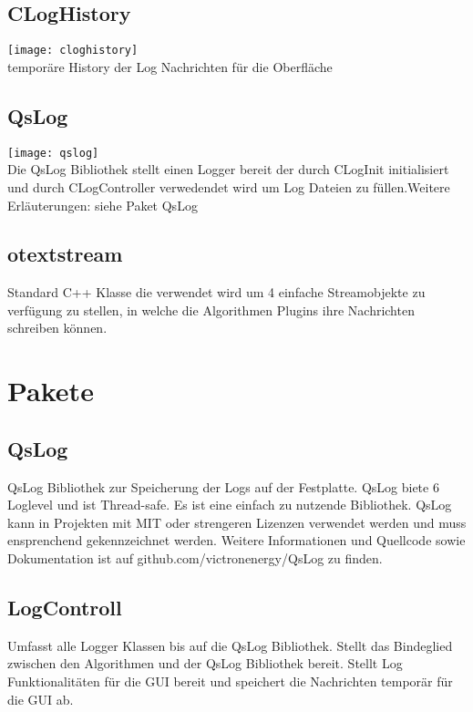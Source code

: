 \subsection{CLogHistory}\label{Logger: CLogHistory}
\texttt{[image: cloghistory]}\\
temporäre History der Log Nachrichten für die Oberfläche 
\beginMembers
{}
\closeMembers
\newpage
\subsection{QsLog}\label{Logger: QsLog}
\texttt{[image: qslog]}\\
Die QsLog Bibliothek stellt einen Logger bereit der durch CLogInit initialisiert und durch CLogController verwedendet wird um Log Dateien zu füllen.Weitere Erläuterungen: siehe Paket QsLog

\subsection{otextstream}\label{Logger: otextstream}
Standard C++ Klasse die verwendet wird um 4 einfache Streamobjekte zu verfügung zu stellen, in welche die Algorithmen Plugins ihre Nachrichten schreiben können.
\section{Pakete}
\subsection{QsLog}
QsLog Bibliothek zur Speicherung der Logs auf der Festplatte.
QsLog biete 6 Loglevel und ist Thread-safe. Es ist eine einfach zu nutzende Bibliothek.
QsLog kann in Projekten mit MIT oder strengeren Lizenzen verwendet werden und muss ensprenchend gekennzeichnet werden.
Weitere Informationen und Quellcode sowie Dokumentation ist auf github.com/victronenergy/QsLog zu finden.
\subsection{LogControll}
Umfasst alle Logger Klassen bis auf die QsLog Bibliothek.
Stellt das Bindeglied zwischen den Algorithmen und der QsLog Bibliothek bereit.
Stellt Log Funktionalitäten für die GUI bereit und speichert die Nachrichten temporär für die GUI ab.
